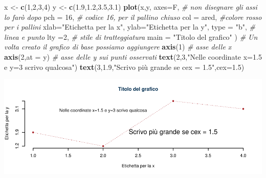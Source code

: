\documentclass[
  11pt,
]{book}
\newenvironment{Shaded}{\begin{snugshade}}{\end{snugshade}}
\newcommand{\AttributeTok}[1]{\textcolor[rgb]{0.13,0.29,0.53}{#1}}
\newcommand{\CommentTok}[1]{\textcolor[rgb]{0.56,0.35,0.01}{\textit{#1}}}
\newcommand{\DecValTok}[1]{\textcolor[rgb]{0.00,0.00,0.81}{#1}}
\newcommand{\FloatTok}[1]{\textcolor[rgb]{0.00,0.00,0.81}{#1}}
\newcommand{\FunctionTok}[1]{\textcolor[rgb]{0.13,0.29,0.53}{\textbf{#1}}}
\newcommand{\NormalTok}[1]{#1}
\newcommand{\OtherTok}[1]{\textcolor[rgb]{0.56,0.35,0.01}{#1}}
\newcommand{\StringTok}[1]{\textcolor[rgb]{0.31,0.60,0.02}{#1}}
\theoremstyle{mytheoremstyle}
\theoremstyle{mydefstyle}
\begin{document}
\begin{Shaded}
\begin{Highlighting}[]
\NormalTok{x }\OtherTok{\textless{}{-}} \FunctionTok{c}\NormalTok{(}\DecValTok{1}\NormalTok{,}\DecValTok{2}\NormalTok{,}\DecValTok{3}\NormalTok{,}\DecValTok{4}\NormalTok{)}
\NormalTok{y }\OtherTok{\textless{}{-}} \FunctionTok{c}\NormalTok{(}\FloatTok{1.9}\NormalTok{,}\FloatTok{1.2}\NormalTok{,}\FloatTok{3.5}\NormalTok{,}\FloatTok{3.1}\NormalTok{)}
\FunctionTok{plot}\NormalTok{(x,y,}
     \AttributeTok{axes=}\NormalTok{F,      }\CommentTok{\# non disegnare gli assi lo farò dopo}
     \AttributeTok{pch =} \DecValTok{16}\NormalTok{,    }\CommentTok{\# codice 16, per il pallino chiuso}
     \AttributeTok{col =}\NormalTok{ ared, }\CommentTok{\#colore rosso per i pallini}
     \AttributeTok{xlab=}\StringTok{"Etichetta per la x"}\NormalTok{,}
     \AttributeTok{ylab=}\StringTok{"Etichetta per la y"}\NormalTok{,}
     \AttributeTok{type =} \StringTok{"b"}\NormalTok{,  }\CommentTok{\# linea e punto}
     \AttributeTok{lty  =}\DecValTok{2}\NormalTok{,     }\CommentTok{\# stile di tratteggiatura}
     \AttributeTok{main =} \StringTok{"Titolo del grafico"}
\NormalTok{          )}
\CommentTok{\# Un volta creato il grafico di base possiamo aggiungere }
\FunctionTok{axis}\NormalTok{(}\DecValTok{1}\NormalTok{) }\CommentTok{\# asse delle x}
\FunctionTok{axis}\NormalTok{(}\DecValTok{2}\NormalTok{,}\AttributeTok{at =}\NormalTok{ y) }\CommentTok{\# asse delle y sui punti osservati}
\FunctionTok{text}\NormalTok{(}\DecValTok{2}\NormalTok{,}\DecValTok{3}\NormalTok{,}\StringTok{"Nelle coordinate x=1.5 e y=3 scrivo qualcosa"}\NormalTok{)}
\FunctionTok{text}\NormalTok{(}\DecValTok{3}\NormalTok{,}\FloatTok{1.9}\NormalTok{,}\StringTok{"Scrivo più grande se cex = 1.5"}\NormalTok{,}\AttributeTok{cex=}\FloatTok{1.5}\NormalTok{)}
\end{Highlighting}
\end{Shaded}

\begin{center}\includegraphics{Appunti_di_Statistica_2025_files/figure-latex/24-Libro-25-1} \end{center}
\end{document}
